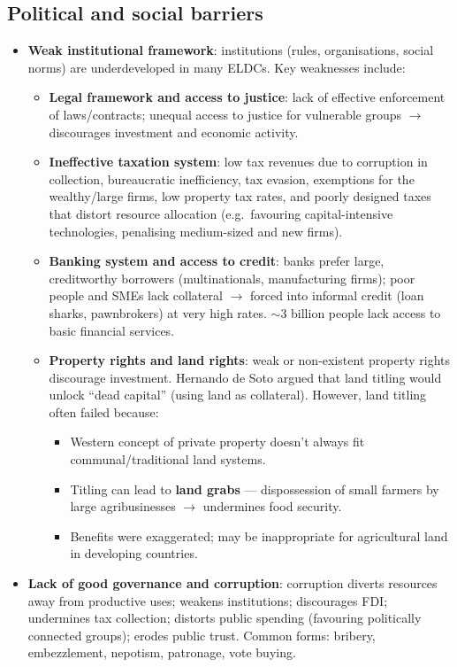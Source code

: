 \documentclass[a4paper,12pt]{article}
\begin{document}
\subsection{Political and social barriers}
\begin{itemize}
  \item \textbf{Weak institutional framework}: institutions (rules, organisations, social norms) are underdeveloped in many ELDCs. Key weaknesses include:
  \begin{itemize}
    \item \textbf{Legal framework and access to justice}: lack of effective enforcement of laws/contracts; unequal access to justice for vulnerable groups $\to$ discourages investment and economic activity.
    \item \textbf{Ineffective taxation system}: low tax revenues due to corruption in collection, bureaucratic inefficiency, tax evasion, exemptions for the wealthy/large firms, low property tax rates, and poorly designed taxes that distort resource allocation (e.g.\ favouring capital-intensive technologies, penalising medium-sized and new firms).
    \item \textbf{Banking system and access to credit}: banks prefer large, creditworthy borrowers (multinationals, manufacturing firms); poor people and SMEs lack collateral $\to$ forced into informal credit (loan sharks, pawnbrokers) at very high rates. $\sim$3 billion people lack access to basic financial services.
    \item \textbf{Property rights and land rights}: weak or non-existent property rights discourage investment. Hernando de Soto argued that land titling would unlock ``dead capital'' (using land as collateral). However, land titling often failed because:
    \begin{itemize}
      \item Western concept of private property doesn't always fit communal/traditional land systems.
      \item Titling can lead to \textbf{land grabs} --- dispossession of small farmers by large agribusinesses $\to$ undermines food security.
      \item Benefits were exaggerated; may be inappropriate for agricultural land in developing countries.
    \end{itemize}
  \end{itemize}
  \item \textbf{Lack of good governance and corruption}: corruption diverts resources away from productive uses; weakens institutions; discourages FDI; undermines tax collection; distorts public spending (favouring politically connected groups); erodes public trust. Common forms: bribery, embezzlement, nepotism, patronage, vote buying.

\end{itemize}
\end{document}
